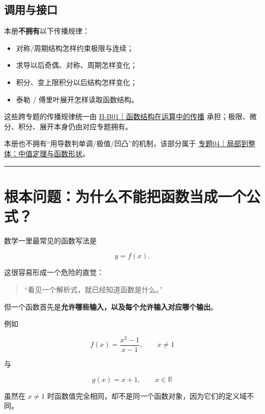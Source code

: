\documentclass[11pt,a4paper]{ctexart}
\providecommand{\tightlist}{}
\begin{document}
\subsection{调用与接口}\label{use-bridge}

本册\textbf{不拥有}以下传播规律：

\begin{itemize}
\tightlist
\item
  对称/周期结构怎样约束极限与连续；
\item
  求导以后奇偶、对称、周期怎样变化；
\item
  积分、变上限积分以后结构怎样变化；
\item
  泰勒 / 傅里叶展开怎样读取函数结构。
\end{itemize}

这些跨专题的传播规律统一由
\href{../50_桥梁专题/H-B01_函数结构在运算中的传播/README.md}{H-B01｜函数结构在运算中的传播}
承担；极限、微分、积分、展开本身仍由对应专题拥有。

本册也不拥有``用导数判单调/极值/凹凸''的机制，该部分属于
\href{../04_局部到整体_中值定理与函数形状/README.md}{专题04｜局部到整体：中值定理与函数形状}。

\begin{center}\rule{0.5\linewidth}{0.5pt}\end{center}

\section{根本问题：为什么不能把函数当成一个公式？}\label{ux6839ux672cux95eeux9898ux4e3aux4ec0ux4e48ux4e0dux80fdux628aux51fdux6570ux5f53ux6210ux4e00ux4e2aux516cux5f0f}

数学一里最常见的函数写法是

\[
y=f(x).
\]

这很容易形成一个危险的直觉：

\begin{quote}
``看见一个解析式，就已经知道函数是什么。''
\end{quote}

但一个函数首先是\textbf{允许哪些输入，以及每个允许输入对应哪个输出}。

例如

\[
f(x)=\frac{x^2-1}{x-1},\qquad x\ne1
\]

与

\[
g(x)=x+1,\qquad x\in\mathbb R
\]

虽然在 \(x\ne1\)
时函数值完全相同，却不是同一个函数对象，因为它们的定义域不同。
\end{document}
